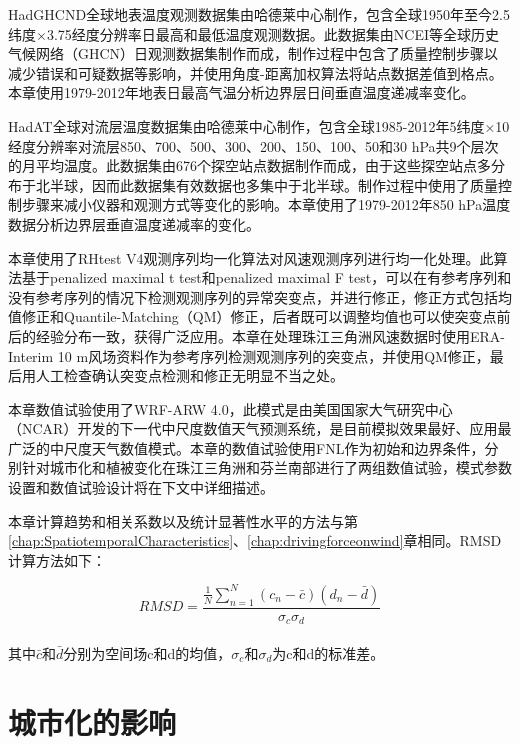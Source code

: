 HadGHCND全球地表温度观测数据集\citep{caesar2006large-scale}由哈德莱中心制作，包含全球1950年至今2.5纬度$\times$3.75经度分辨率日最高和最低温度观测数据。此数据集由NCEI等全球历史气候网络（GHCN）日观测数据集制作而成，制作过程中包含了质量控制步骤以减少错误和可疑数据等影响，并使用角度-距离加权算法将站点数据差值到格点。本章使用1979-2012年地表日最高气温分析边界层日间垂直温度递减率变化。

HadAT全球对流层温度数据集\citep{thorne2005revisiting}由哈德莱中心制作，包含全球1985-2012年5纬度$\times$10经度分辨率对流层850、700、500、300、200、150、100、50和30 hPa共9个层次的月平均温度。此数据集由676个探空站点数据制作而成，由于这些探空站点多分布于北半球，因而此数据集有效数据也多集中于北半球。制作过程中使用了质量控制步骤来减小仪器和观测方式等变化的影响。本章使用了1979-2012年850 hPa温度数据分析边界层垂直温度递减率的变化。

本章使用了RHtest V4观测序列均一化算法\citep{wang2014rhtests}对风速观测序列进行均一化处理。此算法基于penalized maximal t test\citep{wang2007penalized}和penalized maximal F test\citep{wang2008penalized}，可以在有参考序列和没有参考序列的情况下检测观测序列的异常突变点，并进行修正，修正方式包括均值修正和Quantile-Matching（QM）修正，后者既可以调整均值也可以使突变点前后的经验分布一致\citep{wang2010new}，获得广泛应用\citep{vincent2012second, baule2014climatology, yang2019causes}。本章在处理珠江三角洲风速数据时使用ERA-Interim 10 m风场资料作为参考序列检测观测序列的突变点，并使用QM修正，最后用人工检查确认突变点检测和修正无明显不当之处。

本章数值试验使用了WRF-ARW 4.0\citep{skamarock2019description}，此模式是由美国国家大气研究中心（NCAR）开发的下一代中尺度数值天气预测系统，是目前模拟效果最好、应用最广泛的中尺度天气数值模式。本章的数值试验使用FNL作为初始和边界条件，分别针对城市化和植被变化在珠江三角洲和芬兰南部进行了两组数值试验，模式参数设置和数值试验设计将在下文中详细描述。

本章计算趋势和相关系数以及统计显著性水平的方法与第\ref{chap:SpatiotemporalCharacteristics}、\ref{chap:drivingforceonwind}章相同。RMSD计算方法如下：

\begin{equation} \label{eq:rmsd}
RMSD = \frac{\frac{1}{N} \sum_{n=1}^{N} \left( c_{n} - \bar{c} \right) \left( d_{n} - \bar{d} \right) }{\sigma_{c} \sigma_{d}}
\end{equation} ~\\
其中$\bar{c}$和$\bar{d}$分别为空间场c和d的均值，$\sigma_{c}$和$\sigma_{d}$为c和d的标准差。

\section{城市化的影响} \label{sec:urbanimpact}

